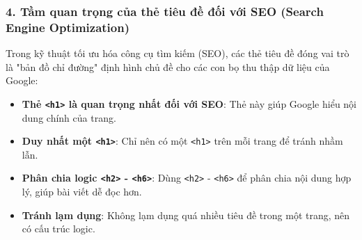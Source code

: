 \documentclass[11pt,oneside]{book}
\newcommand{\thd}[1]{\textcolor{white}{\textbf{\strut #1}}}
\newcommand{\codeinline}[1]{\textcolor{accentOrange}{\texttt{#1}}}
\begin{document}
\begin{prettyTableBox}
\end{prettyTableBox}

\subsubsection{4. Tầm quan trọng của thẻ tiêu đề đối với SEO (Search Engine Optimization)}

Trong kỹ thuật tối ưu hóa công cụ tìm kiếm (SEO), các thẻ tiêu đề đóng vai trò là "bản đồ chỉ đường" định hình chủ đề cho các con bọ thu thập dữ liệu của Google:

\begin{itemize}[leftmargin=1.8em, itemsep=3pt, parsep=0pt]
    \item \textbf{Thẻ \codeinline{<h1>} là quan trọng nhất đối với SEO}: Thẻ này giúp Google hiểu nội dung chính của trang.
    \item \textbf{Duy nhất một \codeinline{<h1>}}: Chỉ nên có một \codeinline{<h1>} trên mỗi trang để tránh nhầm lẫn.
    \item \textbf{Phân chia logic \codeinline{<h2>} - \codeinline{<h6>}}: Dùng \codeinline{<h2>} - \codeinline{<h6>} để phân chia nội dung hợp lý, giúp bài viết dễ đọc hơn.
    \item \textbf{Tránh lạm dụng}: Không lạm dụng quá nhiều tiêu đề trong một trang, nên có cấu trúc logic.
\end{itemize}
\end{document}
